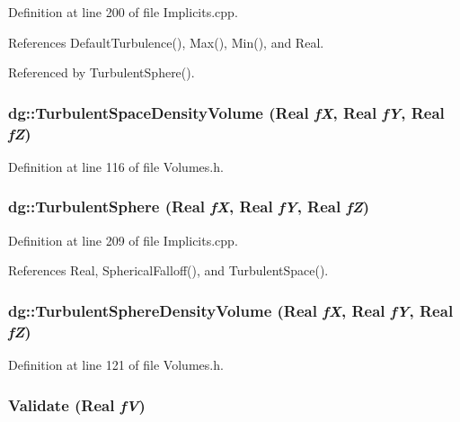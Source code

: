 Definition at line 200 of file Implicits.cpp.

References Default\-Turbulence(), Max(), Min(), and Real.

Referenced by Turbulent\-Sphere().
\subsubsection{ dg::Turbulent\-Space\-Density\-Volume ({\bf Real} {\em f\-X}, {\bf Real} {\em f\-Y}, {\bf Real} {\em f\-Z})\hspace{0.3cm}{\tt  [inline]}}\label{namespacedg_a198}




Definition at line 116 of file Volumes.h.
\subsubsection{ dg::Turbulent\-Sphere ({\bf Real} {\em f\-X}, {\bf Real} {\em f\-Y}, {\bf Real} {\em f\-Z})}\label{namespacedg_a85}




Definition at line 209 of file Implicits.cpp.

References Real, Spherical\-Falloff(), and Turbulent\-Space().
\subsubsection{ dg::Turbulent\-Sphere\-Density\-Volume ({\bf Real} {\em f\-X}, {\bf Real} {\em f\-Y}, {\bf Real} {\em f\-Z})\hspace{0.3cm}{\tt  [inline]}}\label{namespacedg_a199}




Definition at line 121 of file Volumes.h.
\subsubsection{ Validate ({\bf Real} {\em f\-V})\hspace{0.3cm}{\tt  [inline]}}\label{namespacedg_a65}




